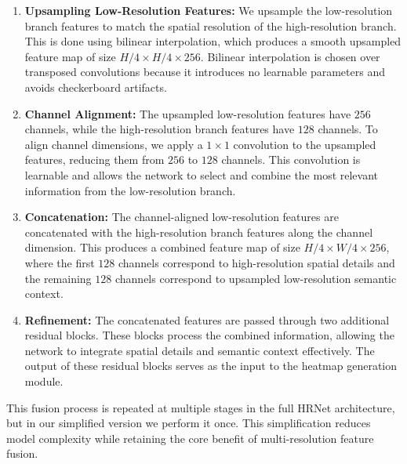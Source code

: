 \begin{enumerate}
    \item[(a)] \textbf{Upsampling Low-Resolution Features:} We upsample the low-resolution branch features to match the spatial resolution of the high-resolution branch. This is done using bilinear interpolation, which produces a smooth upsampled feature map of size \(H/4 \times H/4 \times 256\). Bilinear interpolation is chosen over transposed convolutions because it introduces no learnable parameters and avoids checkerboard artifacts.

    \item[(b)] \textbf{Channel Alignment:} The upsampled low-resolution features have \(256\) channels, while the high-resolution branch features have \(128\) channels. To align channel dimensions, we apply a \(1 \times 1\) convolution to the upsampled features, reducing them from \(256\) to \(128\) channels. This convolution is learnable and allows the network to select and combine the most relevant information from the low-resolution branch.

    \item[(c)] \textbf{Concatenation:} The channel-aligned low-resolution features are concatenated with the high-resolution branch features along the channel dimension. This produces a combined feature map of size \(H/4 \times W/4 \times 256\), where the first \(128\) channels correspond to high-resolution spatial details and the remaining \(128\) channels correspond to upsampled low-resolution semantic context.

    \item[(d)] \textbf{Refinement:} The concatenated features are passed through two additional residual blocks. These blocks process the combined information, allowing the network to integrate spatial details and semantic context effectively. The output of these residual blocks serves as the input to the heatmap generation module.
\end{enumerate}

This fusion process is repeated at multiple stages in the full HRNet architecture, but in our simplified version we perform it once. This simplification reduces model complexity while retaining the core benefit of multi-resolution feature fusion.


